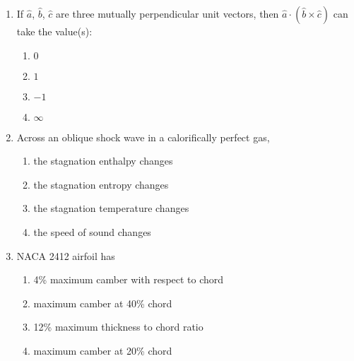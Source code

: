 \documentclass[journal,12pt,onecolumn]{IEEEtran}
\theoremstyle{remark}
\begin{document}
\begin{enumerate}
\item If $\hat{a}$, $\hat{b}$, $\hat{c}$ are three mutually perpendicular unit vectors, then $\hat{a} \cdot (\hat{b} \times \hat{c})$ can take the value(s):

\begin{enumerate}
	\item $0$
	\item $1$
	\item $-1$
	\item $\infty$
\end{enumerate}

\item Across an oblique shock wave in a calorifically perfect gas,

\begin{enumerate}
	\item the stagnation enthalpy changes
	\item the stagnation entropy changes
	\item the stagnation temperature changes
	\item the speed of sound changes
\end{enumerate}

\item NACA 2412 airfoil has

\begin{enumerate}
	\item 4\% maximum camber with respect to chord
	\item maximum camber at 40\% chord
	\item 12\% maximum thickness to chord ratio
	\item maximum camber at 20\% chord
\end{enumerate}



\end{enumerate}
\end{document}
